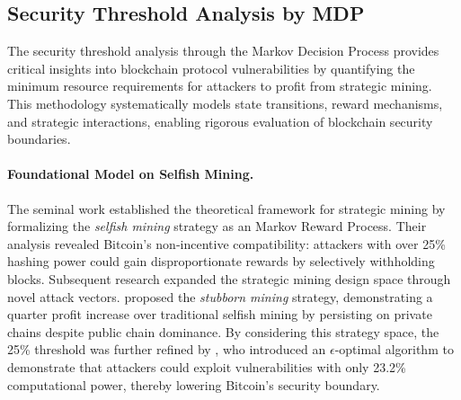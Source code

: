 

\subsection{Security Threshold Analysis by MDP}
The security threshold analysis through the Markov Decision Process provides critical insights into blockchain protocol vulnerabilities by quantifying the minimum resource requirements for attackers to profit from strategic mining. 
This methodology systematically models state transitions, reward mechanisms, and strategic interactions, enabling rigorous evaluation of blockchain security boundaries.

\paragraph{Foundational Model on Selfish Mining.}
The seminal work \cite{eyal2014majority} established the theoretical framework for strategic mining by formalizing the \textit{selfish mining} strategy as an Markov Reward Process. 
Their analysis revealed Bitcoin's non-incentive compatibility: attackers with over 25\% hashing power could gain disproportionate rewards by selectively withholding blocks. 
Subsequent research expanded the strategic mining design space through novel attack vectors. 
\cite{nayak2016stubborn} proposed the \textit{stubborn mining} strategy, demonstrating a quarter profit increase over traditional selfish mining by persisting on private chains despite public chain dominance.
By considering this strategy space, the 25\% threshold was further refined by \cite{sapirshtein2016optimal}, who introduced an 
$\epsilon$-optimal algorithm to demonstrate that attackers could exploit vulnerabilities with only 23.2\% computational power, thereby lowering Bitcoin's security boundary.

